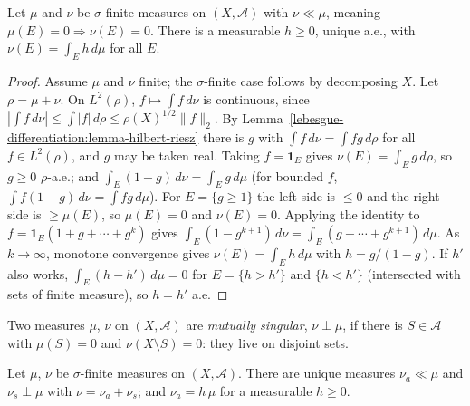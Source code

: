 \begin{theorem}\label{lebesgue-differentiation:theorem-radon-nikodym}
Let $\mu$ and $\nu$ be $\sigma$-finite measures on $(X, \mathcal{A})$ with $\nu \ll \mu$, meaning $\mu(E) = 0 \Rightarrow \nu(E) = 0$. There is a measurable $h \geq 0$, unique a.e., with
$\nu(E) = \int_Eh\,d\mu$ for all $E$.
\end{theorem}

\begin{proof}
Assume $\mu$ and $\nu$ finite; the $\sigma$-finite case follows by decomposing $X$. Let $\rho = \mu + \nu$. On $L^2(\rho)$, $f \mapsto \int f\,d\nu$ is continuous, since
$|\int f\,d\nu| \leq \int|f|\,d\rho \leq \rho(X)^{1/2}\|f\|_2$. By Lemma~\ref{lebesgue-differentiation:lemma-hilbert-riesz} there is $g$ with $\int f\,d\nu = \int fg\,d\rho$ for all $f \in L^2(\rho)$, and $g$ may be taken real. Taking
$f = \mathbf{1}_E$ gives $\nu(E) = \int_Eg\,d\rho$, so $g \geq 0$ $\rho$-a.e.; and $\int_E(1 - g)\,d\nu = \int_Eg\,d\mu$ (for bounded $f$, $\int f(1 - g)\,d\nu = \int fg\,d\mu$). For $E = \{g \geq 1\}$ the left side
is $\leq 0$ and the right side is $\geq \mu(E)$, so $\mu(E) = 0$ and $\nu(E) = 0$. Applying the identity to $f = \mathbf{1}_E(1 + g + \cdots + g^k)$ gives $\int_E(1 - g^{k+1})\,d\nu = \int_E(g + \cdots + g^{k+1})\,d\mu$. As
$k \to \infty$, monotone convergence gives $\nu(E) = \int_Eh\,d\mu$ with $h = g/(1 - g)$. If $h'$ also works, $\int_E(h - h')\,d\mu = 0$ for $E = \{h > h'\}$ and $\{h < h'\}$ (intersected with sets of finite measure), so
$h = h'$ a.e.
\end{proof}

Two measures $\mu$, $\nu$ on $(X, \mathcal{A})$ are \emph{mutually singular}, $\nu \perp \mu$, if there is $S \in \mathcal{A}$ with $\mu(S) = 0$ and $\nu(X \setminus S) = 0$: they live on disjoint sets.

\begin{theorem}\label{lebesgue-differentiation:theorem-lebesgue-decomposition}
Let $\mu$, $\nu$ be $\sigma$-finite measures on $(X, \mathcal{A})$. There are unique measures $\nu_a \ll \mu$ and $\nu_s \perp \mu$ with $\nu = \nu_a + \nu_s$; and $\nu_a = h\,\mu$ for a measurable $h \geq 0$.
\end{theorem}

